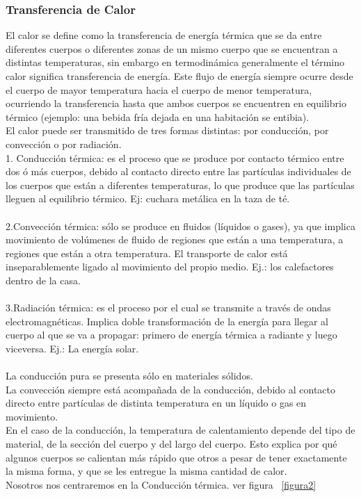 \documentclass[11pt,a4paper]{article}
\begin{document}
\subsubsection{Transferencia de Calor}
El calor se define como la transferencia de energía térmica que se da entre diferentes cuerpos o diferentes zonas de un mismo cuerpo que se encuentran a distintas temperaturas, sin embargo en termodinámica generalmente el término calor significa transferencia de energía. Este flujo de energía siempre ocurre desde el cuerpo de mayor temperatura hacia el cuerpo de menor temperatura, ocurriendo la transferencia hasta que ambos cuerpos se encuentren en equilibrio térmico (ejemplo: una bebida fría dejada en una habitación se entibia).
\\
El calor puede ser transmitido de tres formas distintas: por conducción, por convección o por radiación.
\\
1. Conducción térmica: es el proceso que se produce por contacto térmico entre dos ó más cuerpos, debido al contacto directo entre las partículas individuales de los cuerpos que están a diferentes temperaturas, lo que produce que las partículas lleguen al equilibrio térmico. Ej: cuchara metálica en la taza de té.\\
\\
2.Convección térmica: sólo se produce en fluidos (líquidos o gases), ya que implica movimiento de volúmenes de fluido de regiones que están a una temperatura, a regiones que están a otra temperatura. El transporte de calor está inseparablemente ligado al movimiento del propio medio. Ej.: los calefactores dentro de la casa.\\
\\
3.Radiación térmica: es el proceso por el cual se transmite a través de ondas electromagnéticas. Implica doble transformación de la energía para llegar al cuerpo al que se va a propagar: primero de energía térmica a radiante y luego viceversa. Ej.: La energía solar.
\\
\\La conducción pura se presenta sólo en materiales sólidos.\\La convección siempre está acompañada de la conducción, debido al contacto directo entre partículas de distinta temperatura en un líquido o gas en movimiento.\\En el caso de la conducción, la temperatura de calentamiento depende del tipo de material, de la sección del cuerpo y del largo del cuerpo. Esto explica por qué algunos cuerpos se calientan más rápido que otros a pesar de tener exactamente la misma forma, y que se les entregue la misma cantidad de calor.\\Nosotros nos centraremos en la Conducción térmica. ver figura ~\ref{figura2}
\end{document}
